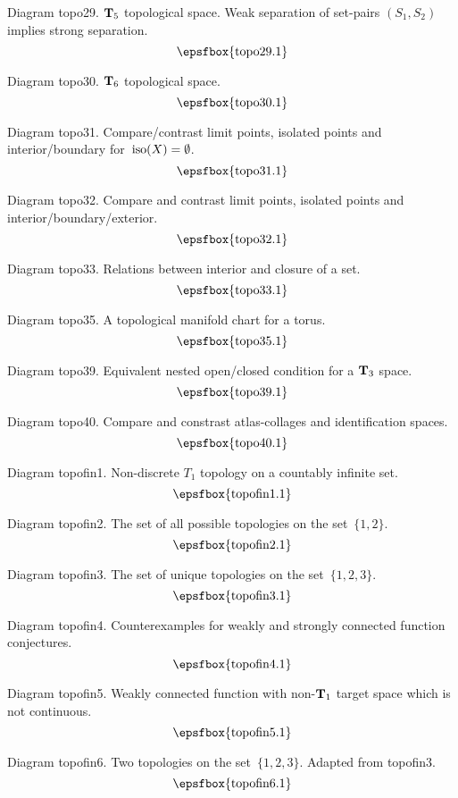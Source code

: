 Diagram topo29. ${\bf T}_5$ topological space. Weak separation of set-pairs
$(S_1,S_2)$ implies strong separation.
$$
\centerline{\epsfbox{topo29.1}}
$$

Diagram topo30. ${\bf T}_6$ topological space.
$$
\centerline{\epsfbox{topo30.1}}
$$

Diagram topo31. Compare/contrast limit points, isolated points and
interior/boundary for~$\mathop{\rm iso}\nolimits(X)=\emptyset$.
$$
\centerline{\epsfbox{topo31.1}}
$$

\filleject

Diagram topo32. Compare and contrast limit points, isolated points and
interior/boundary/exterior.
$$
\centerline{\epsfbox{topo32.1}}
$$

Diagram topo33. Relations between interior and closure of a set.
$$
\centerline{\epsfbox{topo33.1}}
$$

Diagram topo35. A topological manifold chart for a torus.
$$
\centerline{\epsfbox{topo35.1}}
$$

Diagram topo39. Equivalent nested open/closed condition for a ${\bf T}_3$ space.
$$
\centerline{\epsfbox{topo39.1}}
$$

\filleject

Diagram topo40. Compare and constrast atlas-collages and identification spaces.
$$
\centerline{\epsfbox{topo40.1}}
$$

\secteject
\edef\SECTtopofin{\the\pageno}

Diagram topofin1. Non-discrete $T_1$ topology on a countably infinite set.
$$
\centerline{\epsfbox{topofin1.1}}
$$

Diagram topofin2. The set of all possible topologies on the set~$\{1,2\}$.
$$
\centerline{\epsfbox{topofin2.1}}
$$

Diagram topofin3. The set of unique topologies on the set~$\{1,2,3\}$.
$$
\centerline{\epsfbox{topofin3.1}}
$$

Diagram topofin4. Counterexamples for weakly and strongly connected function
conjectures.
$$
\centerline{\epsfbox{topofin4.1}}
$$

Diagram topofin5. Weakly connected function with non-${\bf T}_1$ target space which
is not continuous.
$$
\centerline{\epsfbox{topofin5.1}}
$$

Diagram topofin6. Two topologies on the set~$\{1,2,3\}$. Adapted from topofin3.
$$
\centerline{\epsfbox{topofin6.1}}
$$

